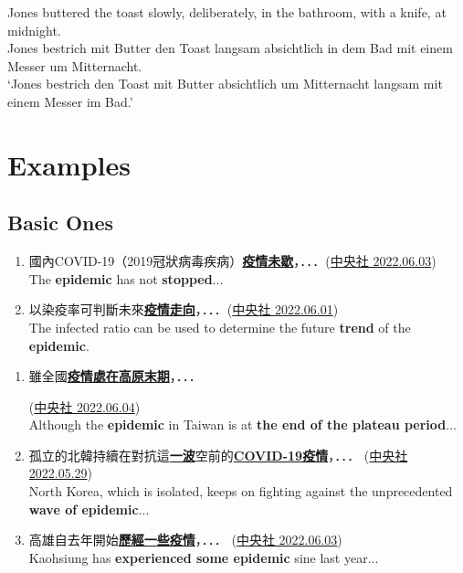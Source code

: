 \begin{singlespacing}
\begin{exe}
\ex
\gll Jones buttered the toast slowly, deliberately, in the bathroom, with a knife, at midnight.\\
Jones {bestrich mit Butter} den Toast langsam absichtlich in dem Bad mit einem Messer um Mitternacht.\\
\glt `Jones bestrich den Toast mit Butter absichtlich um Mitternacht langsam mit einem Messer im Bad.'
\end{exe}
\end{singlespacing}


\section{Examples}
\subsection{Basic Ones}

    \begin{enumerate}[label= (\arabic*)] %
            \item 國內COVID-19（2019冠狀病毒疾病）\underline{\textbf{疫情未歇}}，．．．(\href{https://www.cna.com.tw/news/ahel/202206010196.aspx}{中央社 2022.06.03}) \\
            The \textbf{epidemic} has not \textbf{stopped}...
            \item 以染疫率可判斷未來\underline{\textbf{疫情走向}}，．．．(\href{https://www.cna.com.tw/news/ahel/202206010309.aspx}{中央社 2022.06.01}) \\
            The infected ratio can be used to determine the future \textbf{trend} of the \textbf{epidemic}.
    \end{enumerate}


    \begin{enumerate}[resume, label = (\arabic*)] %
        \item \hypertarget{sixteenth}{雖全國\underline{\textbf{疫情處在高原末期}}，．．．}(\href{https://www.cna.com.tw/news/ahel/202206040137.aspx}{中央社 2022.06.04}) \\
        Although the \textbf{epidemic} in Taiwan is at \textbf{the end of the plateau period}...
        \item 孤立的北韓持續在對抗這\underline{\textbf{一波}}空前的\underline{\textbf{COVID-19疫情}}，．．． (\href{https://www.cna.com.tw/news/aopl/202205290137.aspx}{中央社 2022.05.29}) \\
        North Korea, which is isolated, keeps on fighting against the unprecedented \textbf{wave of epidemic}...
        \item 高雄自去年開始\underline{\textbf{歷經一些疫情}}，．．． (\href{https://www.cna.com.tw/news/aloc/202206030194.aspx}{中央社 2022.06.03}) \\
        Kaohsiung has \textbf{experienced some epidemic} sine last year...
    \end{enumerate}

